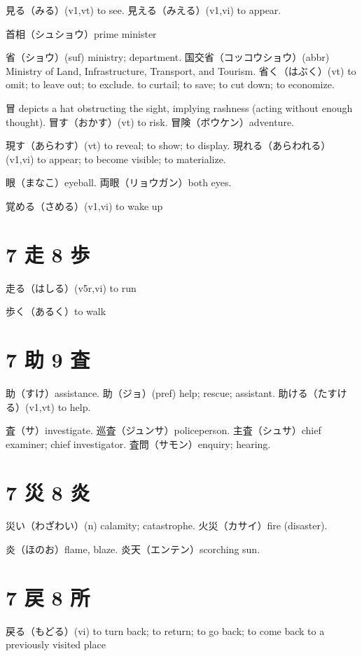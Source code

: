 見る（みる）(v1,vt) to see.
見える（みえる）(v1,vi) to appear.

首相（シュショウ）prime minister

省（ショウ）(suf) ministry; department.
国交省（コッコウショウ）(abbr)
Ministry of Land, Infrastructure, Transport, and Tourism.
省く（はぶく）(vt)
to omit; to leave out; to exclude.
to curtail; to save; to cut down; to economize.

冒 depicts a hat obstructing the sight, implying rashness
(acting without enough thought).
冒す（おかす）(vt) to risk.
冒険（ボウケン）adventure.

現す（あらわす）(vt) to reveal; to show; to display.
現れる（あらわれる）(v1,vi) to appear; to become visible; to materialize.

眼（まなこ）eyeball.
両眼（リョウガン）both eyes.

覚める（さめる）(v1,vi) to wake up

\section{7 走 8 歩}

走る（はしる）(v5r,vi) to run

歩く（あるく）to walk

\section{7 助 9 査}

助（すけ）assistance.
助（ジョ）(pref) help; rescue; assistant.
助ける（たすける）(v1,vt) to help.

査（サ）investigate.
巡査（ジュンサ）policeperson.
主査（シュサ）chief examiner; chief investigator.
査問（サモン）enquiry; hearing.

\section{7 災 8 炎}

災い（わざわい）(n) calamity; catastrophe.
火災（カサイ）fire (disaster).

炎（ほのお）flame, blaze.
炎天（エンテン）scorching sun.

\section{7 戻 8 所}

戻る（もどる）(vi) to turn back; to return; to go back;
to come back to a previously visited place

